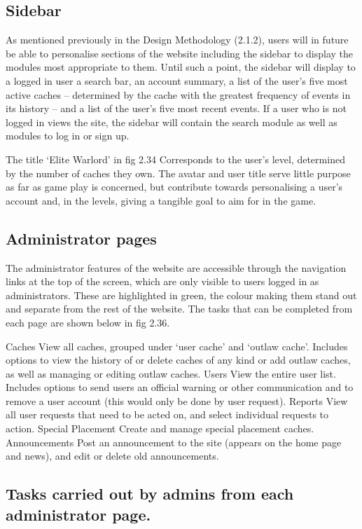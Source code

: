 \subsection{Sidebar}

As mentioned previously in the Design Methodology (2.1.2), users will in future be able to personalise sections of the website including the sidebar to display the modules most appropriate to them. Until such a point, the sidebar will display to a logged in user a search bar, an account summary, a list of the user’s five most active caches – determined by the cache with the greatest frequency of events in its history – and a list of the user’s five most recent events. If a user who is not logged in views the site, the sidebar will contain the search module as well as modules to log in or sign up.

The title ‘Elite Warlord’ in fig 2.34 Corresponds to the user’s level, determined by the number of caches they own. The avatar and user title serve little purpose as far as game play is concerned, but contribute towards personalising a user’s account and, in the levels, giving a tangible goal to aim for in the game.

\subsection{Administrator pages}

The administrator features of the website are accessible through the navigation links at the top of the screen, which are only visible to users logged in as administrators. These are highlighted in green, the colour making them stand out and separate from the rest of the website. The tasks that can be completed from each page are shown below in fig 2.36. 

Caches	View all caches, grouped under ‘user cache’ and ‘outlaw cache’. Includes options to view the history of or delete caches of any kind or add outlaw caches, as well as managing or editing outlaw caches.
Users	View the entire user list. Includes options to send users an official warning or other communication and to remove a user account (this would only be done by user request).
Reports	View all user requests that need to be acted on, and select individual requests to action.
Special Placement	Create and manage special placement caches.
Announcements	Post an announcement to the site (appears on the home page and news), and edit or delete old announcements.

\subsection{Tasks carried out by admins from each administrator page.}

